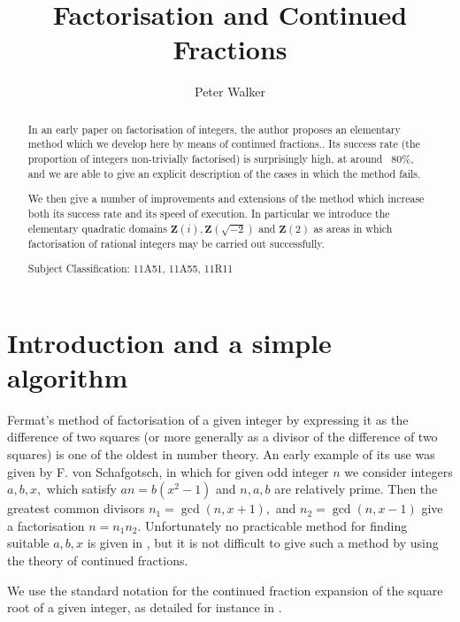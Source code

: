 \documentclass[12pt]{article}
\begin{document}
\title{Factorisation and Continued Fractions}
\author{Peter Walker}
\maketitle

\begin{abstract}
In an early paper \cite{vonSchafgotsch:1786:FVS} on factorisation of
integers, the author proposes an elementary method which we develop here by
means of continued fractions.. Its success rate (the proportion of integers
non-trivially factorised) is surprisingly high, at around \ 80\%, and we are
able to give an explicit description of the cases in which the method fails.

We then give a number of improvements and extensions of the method which
increase both its success rate and its speed of execution. In particular we
introduce the elementary quadratic domains $\mathbf{Z}(i),\mathbf{Z}(\sqrt{-2%
})$ and $\mathbf{Z}(2)$ as areas in which factorisation of rational integers
may be carried out successfully.

Subject Classification: 11A51, 11A55, 11R11
\end{abstract}

\section{Introduction and a simple algorithm\label{int}}

Fermat's method of factorisation of a given integer by expressing it as the
difference of two squares (or more generally as a divisor of the difference
of two squares) is one of the oldest in number theory. An early example of
its use was given by F. von Schafgotsch, \cite{vonSchafgotsch:1786:FVS} in
which for given odd integer $n$ we consider integers $a,b,x,$ which satisfy $%
an=b\left( x^{2}-1\right) $ and $n,a,b$ are relatively prime. Then the
greatest common divisors $n_{1}=\gcd \left( n,x+1\right) ,$ and $n_{2}=\gcd
\left( n,x-1\right) $ give a factorisation $n=n_{1}n_{2}.$ Unfortunately no
practicable method for finding suitable $a,b,x$ is given in \cite%
{vonSchafgotsch:1786:FVS}, but it is not difficult to give such a method by
using the theory of continued fractions.

We use the standard notation for the continued fraction expansion of the
square root of a given integer, as detailed for instance in \cite%
{Davenport:1970:THA}.
\end{document}
